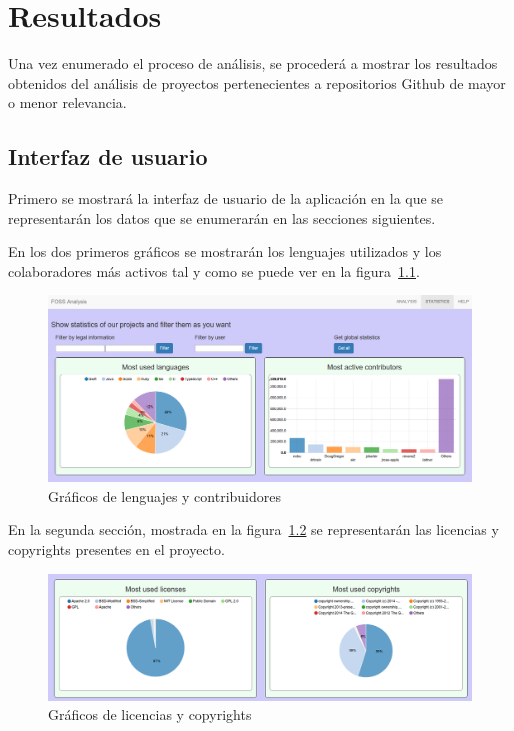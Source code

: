 \documentclass[a4paper, spanish, 12pt]{book}
\begin{document}
\cleardoublepage
\chapter{Resultados}

Una vez enumerado el proceso de an\'alisis, se proceder\'a a mostrar los resultados
obtenidos del an\'alisis de proyectos pertenecientes a repositorios Github de
mayor o menor relevancia.

\section{Interfaz de usuario}
\label{sec:user_interface}

Primero se mostrar\'a la interfaz de usuario de la aplicaci\'on en la que se representar\'an
los datos que se enumerar\'an en las secciones siguientes.

En los dos primeros gr\'aficos se mostrar\'an los lenguajes utilizados y los colaboradores
m\'as activos tal y como se puede ver en la figura~\ref{fig:first_row}.

\begin{figure}
  \centering
  \includegraphics[width=12cm, keepaspectratio]{img/first_row}
  \caption{Gr\'aficos de lenguajes y contribuidores}
  \label{fig:first_row}
\end{figure}

En la segunda secci\'on, mostrada en la figura~\ref{fig:second_row} se representar\'an
las licencias y copyrights presentes en el proyecto.

\begin{figure}
  \centering
  \includegraphics[width=12cm, keepaspectratio]{img/second_row}
  \caption{Gr\'aficos de licencias y copyrights}
  \label{fig:second_row}
\end{figure}
\end{document}
